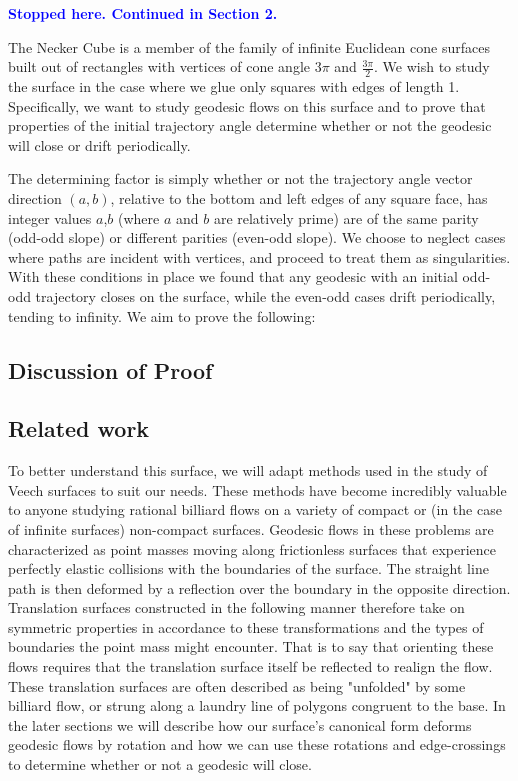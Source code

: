 \documentclass[]{article}
\newcommand{\compav}[1]{\textbf{\textcolor{blue}{#1}}}
\begin{document}
\compav{Stopped here. Continued in Section 2.}

The Necker Cube is a member of the family of infinite Euclidean cone surfaces built out of rectangles with vertices of cone angle $3\pi$ and $\frac{3\pi}{2}$. We wish to study the surface in the case where we glue only squares with edges of length 1. Specifically, we want to study geodesic flows on this surface and to prove that properties of the initial trajectory angle determine whether or not the geodesic will close or drift periodically. 

The determining factor is simply whether or not the trajectory angle vector direction $(a,b)$, relative to the bottom and left edges of any square face, has integer values $a$,$b$ (where $a$ and $b$ are relatively prime) are of the same parity (odd-odd slope) or different parities (even-odd slope). We choose to neglect cases where paths are incident with vertices, and proceed to treat them as singularities. With these conditions in place we found that any geodesic with an initial odd-odd trajectory closes on the surface, while the even-odd cases drift periodically, tending to infinity. We aim to prove the following:



\subsection{Discussion of Proof}
\subsection{Related work}


To better understand this surface, we will adapt methods used in the study of Veech surfaces to suit our needs. These methods have become incredibly valuable to anyone studying rational billiard flows on a variety of compact or (in the case of infinite surfaces) non-compact surfaces. Geodesic flows in these problems are characterized as point masses moving along frictionless surfaces that experience perfectly elastic collisions with the boundaries of the surface. The straight line path is then deformed by a reflection over the boundary in the opposite direction. Translation surfaces constructed in the following manner therefore take on symmetric properties in accordance to these transformations and the types of boundaries the point mass might encounter. That is to say that orienting these flows requires that the translation surface itself be reflected to realign the flow. These translation surfaces are often described as being "unfolded" by some billiard flow, or strung along a laundry line of polygons congruent to the base. In the later sections we will describe how our surface's canonical form deforms geodesic flows by rotation and how we can use these rotations and edge-crossings to determine whether or not a geodesic will close.
\end{document}
